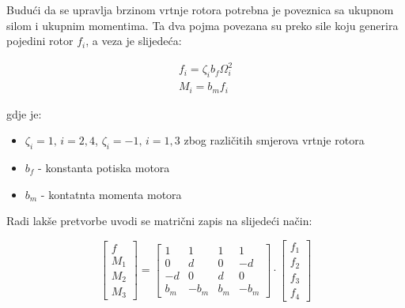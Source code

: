 \documentclass[times, utf8, diplomski]{fer}
\begin{document}
\noindent Budući da se upravlja brzinom vrtnje rotora potrebna je poveznica sa ukupnom silom i ukupnim momentima. Ta dva pojma povezana su preko sile koju generira pojedini rotor $f_i$, a veza je slijedeća:

\begin{gather}
	f_i = \zeta_i b_f \Omega_{i}^2 \\
	M_i = b_m f_i
\end{gather}

gdje je:
\begin{itemize}
	\item $\zeta_i = 1,\, i = 2, 4$, $\zeta_i = -1,\, i=1,3$ zbog različitih smjerova vrtnje rotora
	\item $b_f$ - konstanta potiska motora
	\item $b_m$ - kontatnta momenta motora
\end{itemize}

\newpage
\clearpage

Radi lakše pretvorbe uvodi se matrični zapis na slijedeći način: 

\begin{equation}
	\begin{bmatrix}
		f \\
		M_1 \\
		M_2 \\
		M_3 
	\end{bmatrix} 
	=
	\begin{bmatrix}
		1	&	1	&	1	&	1 \\
		0	&	d	&	0	&	-d \\
		-d 	&	0	&	d	&	0 \\
		b_m &	-b_m	& 	b_m	& -b_m
	\end{bmatrix}
	\cdot
	\begin{bmatrix}
		f_1 \\
		f_2 \\
		f_3 \\
		f_4
	\end{bmatrix}
\end{equation}
\end{document}
